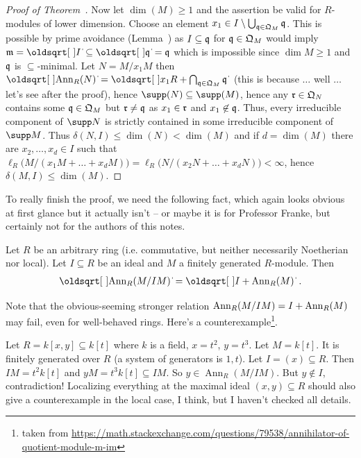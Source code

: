 \documentclass[a4paper,parskip=half,numbers=enddot, DIV=12]{scrreprt}
\begin{document}
\begin{proof}[Proof of Theorem~]
    Now let $\dim(M)\geq 1$ and the assertion be valid for $R$-modules of lower dimension. Choose an element $x_1 \in I  \setminus \bigcup_{\mathfrak{q}\in \mathfrak{Q}_M}\mathfrak{q}$. This is possible by prime avoidance (Lemma~) as $I\subseteq \mathfrak{q}$ for $\mathfrak{q}\in\mathfrak{Q}_M$ would imply $\mm = \sqrt{I}\subseteq \sqrt{\qq} = \qq$ which is impossible since $\dim M \geq 1$ and $\mathfrak{q}$ is $\subseteq$-minimal. Let $N= M/x_1 M$ then $\sqrt{\Ann_R(N)} = \sqrt{x_1R + \bigcap_{\qq\in \QQ_M}\qq}$ (this is because $\ldots$ well $\ldots$ let's see after the proof), hence $\supp(N) \subseteq \supp(M)$, hence any $\mathfrak{r}\in \mathfrak{Q}_N$ contains some $\mathfrak{q}\in \mathfrak{Q}_M$ but $\mathfrak{r} \neq \mathfrak{q}$ as $x_1\in \mathfrak{r}$ and $x_1\not \in \mathfrak{q}$. Thus, every irreducible component of $\supp N$ is strictly contained in some irreducible component of $\supp M$. Thus $\delta(N,I) \leq \dim (N) < \dim(M)$ and if $d=\dim(M)$ there are $x_2,\ldots, x_d\in I$ such that $\ell_R\big(M/(x_1M+\ldots+x_dM)\big) = \ell_R\big(N/(x_2N+\ldots+x_dN)\big) < \infty$, hence $\delta(M,I) \leq \dim(M)$.
\end{proof}
To really finish the proof, we need the following fact, which again looks obvious at first glance but it actually isn't -- or maybe it is for Professor Franke, but certainly not for the authors of this notes.
\begin{lem}
	Let $R$ be an arbitrary ring (i.e. commutative, but neither necessarily Noetherian nor local). Let $I\subseteq R$ be an ideal and $M$ a finitely generated $R$-module. Then
	\begin{align*}
		\sqrt{\Ann_R(M/IM)}=\sqrt{I+\Ann_R(M)}\;.
	\end{align*}
\end{lem}
\begin{rem*}
	Note that the obvious-seeming stronger relation $\operatorname{Ann}_R(M/IM)=I+\operatorname{Ann}_R(M)$ may fail, even for well-behaved rings. Here's a counterexample\footnote{taken from \url{https://math.stackexchange.com/questions/79538/annihilator-of-quotient-module-m-im}}.
	
	 Let $R=k[x,y]\subseteq k[t]$ where $k$ is a field, $x=t^2$, $y=t^3$. Let $M=k[t]$. It is finitely generated over $R$ (a system of generators is $1, t$). 
	Let $I=(x)\subseteq R$. Then $IM=t^2k[t]$ and $yM=t^3k[t]\subseteq IM$. So $y\in \operatorname{Ann}_R(M/IM)$. But $y\notin I$, contradiction! Localizing everything at the maximal ideal $(x,y)\subseteq R$ should also give a counterexample in the local case, I think, but I haven't checked all details.
\end{rem*}
\end{document}
